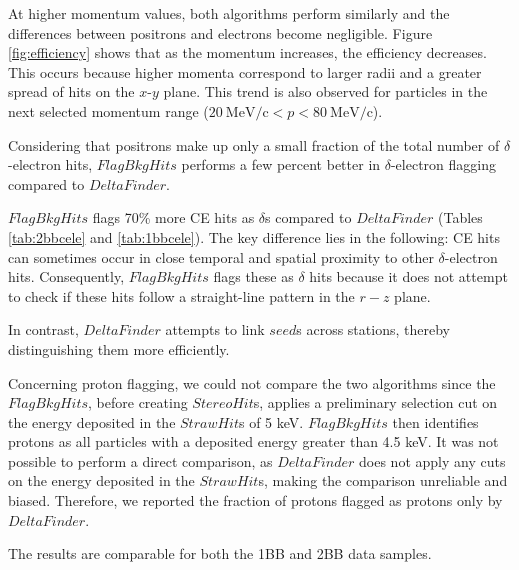 At higher momentum values, 
both algorithms perform similarly and the 
differences between positrons and 
electrons become negligible. 
Figure \ref{fig:efficiency} shows that as the momentum 
increases, the efficiency decreases. This occurs because 
higher momenta correspond to larger radii and a 
greater spread of hits on the $x$-$y$ plane. 
This trend is also observed for particles in the 
next selected momentum range ($20 \ \text{MeV/c} <p<80 \ \text{MeV/c}$).

Considering that positrons make up only a small fraction 
of the total number of $\delta$-electron hits, $FlagBkgHits$ 
performs a few percent better in $\delta$-electron flagging 
compared to $DeltaFinder$.

$FlagBkgHits$ flags 70\% more CE hits 
as $\delta$s compared to $DeltaFinder$ (Tables \ref{tab:2bbcele} 
and \ref{tab:1bbcele}). 
The key difference lies in the following: 
CE hits can sometimes occur in close 
temporal and spatial proximity to other $\delta$-electron hits. 
Consequently, $FlagBkgHits$ flags these as $\delta$ hits 
because it does not attempt to check if these hits follow 
a straight-line pattern in the $r-z$ plane.

In contrast, $DeltaFinder$ attempts to link $seed$s 
across stations, thereby 
distinguishing them more efficiently.

Concerning proton flagging, we could 
not compare the two 
algorithms since the $FlagBkgHits$, 
before creating $StereoHit$s, 
applies a preliminary selection cut 
on the energy deposited in 
the $StrawHit$s of 5 keV. 
$FlagBkgHits$ then identifies 
protons as all particles with 
a deposited energy greater than 
4.5 keV. It was not possible to 
perform a direct comparison, 
as $DeltaFinder$ does not apply any  
cuts on the energy deposited in 
the $StrawHit$s, making the 
comparison unreliable and biased. 
Therefore, we reported the fraction of protons 
flagged as protons only by $DeltaFinder$.


The results are comparable for both the 1BB and 2BB data samples.

